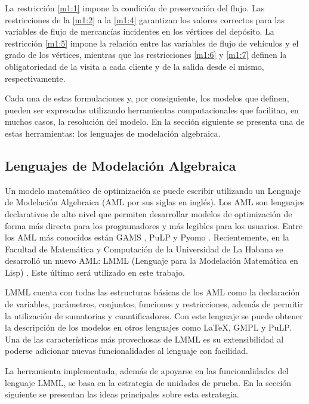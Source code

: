 La restricción \ref{m1:1} impone la condición de preservación del flujo. Las restricciones de la \ref{m1:2} a la \ref{m1:4} garantizan los valores correctos para las variables de flujo de mercancías incidentes en los vértices del depósito. La restricción \ref{m1:5} impone la relación entre las variables de flujo de vehículos y el grado de los vértices, mientras que las restricciones \ref{m1:6} y \ref{m1:7} definen la obligatoriedad de la visita a cada cliente y de la salida desde el mismo, respectivamente.

Cada una de estas formulaciones y, por consiguiente, los modelos que definen, pueden ser expresadas utilizando herramientas computacionales que facilitan, en muchos casos, la resolución del modelo. En la sección siguiente se presenta una de estas herramientas: los lenguajes de modelación algebraica.

\subsection{Lenguajes de Modelación Algebraica}

Un modelo matemático de optimización se puede escribir utilizando un Lenguaje de Modelación Algebraica (AML por sus siglas en inglés). Los AML son lenguajes declarativos de alto nivel que permiten desarrollar modelos de optimización de forma más directa para los programadores y más legibles para los usuarios. Entre los AML más conocidos están GAMS \cite{gams, rosenthal@gams}, PuLP \cite{mitchell@pulp2009, mitchell@pulp2011} y Pyomo \cite{hart@pyomo}. Recientemente, en la Facultad de Matemática y Computación de la Universidad de La Habana se desarrolló un nuevo AML: LMML (Lenguaje para la Modelación Matemática en Lisp) \cite{claudia@lmml}. Este último será utilizado en este trabajo.

LMML cuenta con todas las estructuras básicas de los AML como la declaración de variables, parámetros, conjuntos, funciones y restricciones, además de permitir la utilización de sumatorias y cuantificadores. Con este lenguaje se puede obtener la descripción de los modelos en otros lenguajes como \LaTeX, GMPL y PuLP. Una de las características más provechosas de LMML es su extensibilidad al poderse adicionar nuevas funcionalidades al lenguaje con facilidad.

La herramienta implementada, además de apoyarse en las funcionalidades del lenguaje LMML, se basa en la estrategia de unidades de prueba. En la sección siguiente se presentan las ideas principales sobre esta estrategia.

